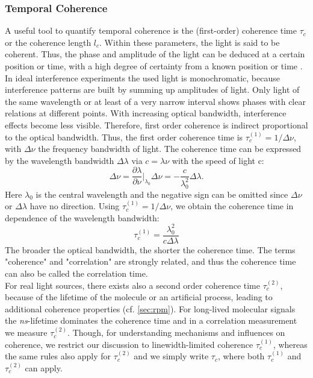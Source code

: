 \subsubsection{Temporal Coherence}\label{sec:temporal_coherence}
A useful tool to quantify temporal coherence is the (first-order) coherence time $\tau_c$ or the coherence length $l_c$. Within these parameters, the light is said to be coherent. Thus, the phase and amplitude of the light can be deduced at a certain position or time, with a high degree of certainty from a known position or time \cite{fox_quantum_2006}. In ideal interference experiments the used light is monochromatic, because interference patterns are built by summing up amplitudes of light. Only light of the same wavelength or at least of a very narrow interval shows phases with clear relations at different points. With increasing optical bandwidth, interference effects become less visible. Therefore, first order coherence is indirect proportional to the optical bandwidth. Thus, the first order coherence time is $\tau_c^{(1)}=1/{\Delta\nu}$, with $\Delta\nu$ the frequency bandwidth of light. The coherence time can be expressed by the wavelength bandwidth $\Delta\lambda$ via $c= \lambda\nu$ with the speed of light c:
\begin{equation}\label{eq:coherence1}
	\Delta\nu=\dfrac{\partial\lambda}{\partial\nu}\Big|_{\lambda_0}\Delta\nu=-\dfrac{c}{\lambda^2_0}\Delta\lambda.
\end{equation}
Here $\lambda_0$ is the central wavelength and the negative sign can be omitted since $\Delta\nu$ or $\Delta\lambda$ have no direction.
Using $\tau_c^{(1)}=1/{\Delta\nu}$, we obtain the coherence time in dependence of the wavelength bandwidth:
\begin{equation}\label{eq:coherence2}
	\tau_c^{(1)}=\dfrac{\lambda^2_0}{c\Delta\lambda}
\end{equation}
The broader the optical bandwidth, the shorter the coherence time. The terms "coherence" and "correlation" are strongly related, and thus the coherence time can also be called the correlation time.\\
For real light sources, there exists also a second order coherence time $\tau_c^{(2)}$, because of the lifetime of the molecule or an artificial process, leading to additional coherence properties (cf. \cref{sec:rpm}).
For long-lived molecular signals the \textit{ns}-lifetime dominates the coherence time and in a correlation measurement we measure $\tau_c^{(2)}$. Though, for understanding mechanisms and influences on coherence, we restrict our discussion to linewidth-limited coherence $\tau_c^{(1)}$, whereas the same rules also apply for $\tau_c^{(2)}$ and we simply write $\tau_c$, where both $\tau_c^{(1)}$ and $\tau_c^{(2)}$ can apply.\\

